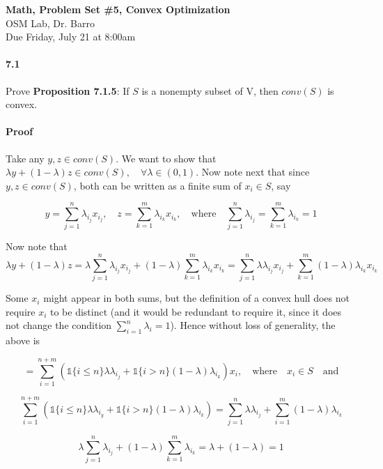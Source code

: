 \documentclass[letterpaper,12pt]{article}
\theoremstyle{definition}
\begin{document}
\begin{flushleft}
   \textbf{\large{Math, Problem Set \#5, Convex Optimization}} \\[5pt]
   OSM Lab, Dr. Barro\\[5pt]
   Due Friday, July 21 at 8:00am
\end{flushleft}

\vspace{5mm}


\paragraph{7.1} Prove \textbf{Proposition 7.1.5}: If $S$ is a nonempty subset of V, then $conv(S)$ is convex.

\paragraph{Proof} Take any $y, z \in conv(S)$. We want to show that $\lambda y + (1 - \lambda) z \in conv(S), \quad \forall \lambda \in (0,1)$. 
Now note next that since $y, z \in conv(S)$, both can be written as a finite sum of $x_i \in S$, say

$$ y = \sum_{j = 1}^n \lambda_{i_j} x_{i_j}, \quad z = \sum_{k = 1}^m \lambda_{i_k} x_{i_k}, \quad \text{where} \quad \sum_{j = 1}^n \lambda_{i_j} = \sum_{k = 1}^m \lambda_{i_k} = 1$$

Now note that 
$$\lambda y + (1 - \lambda) z = \lambda \sum_{j = 1}^n \lambda_{i_j} x_{i_j} + (1 - \lambda) \sum_{k = 1}^m \lambda_{i_k} x_{i_k} 
=  \sum_{j = 1}^n \lambda \lambda_{i_j} x_{i_j} + \sum_{k = 1}^m (1 - \lambda) \lambda_{i_k} x_{i_k}$$

Some $x_i$ might appear in both sums, but the definition of a convex hull does not require $x_i$ to be distinct (and it would be redundant to require it, since it does not change the condition $\sum_{i = 1}^n \lambda_{i} = 1$). Hence without loss of generality, the above is

$$ =  \sum_{i = 1}^{n + m} (\mathds{1}\{i \le n\} \lambda \lambda_{i_j} + \mathds{1}\{i > n\}  (1 - \lambda) \lambda_{i_k}) x_{i}, \quad \text{where} \quad x_{i} \in S \quad \text{and}$$

$$\sum_{i = 1}^{n + m} (\mathds{1}\{i \le n\} \lambda \lambda_{i_y} + \mathds{1}\{i > n\}  (1 - \lambda) \lambda_{i_k}) 
= \sum_{j = 1}^n \lambda \lambda_{i_j}  + \sum_{i = 1}^m (1 - \lambda) \lambda_{i_k}  $$

$$ \lambda \sum_{j = 1}^n \lambda_{i_j} + (1 - \lambda) \sum_{k = 1}^m \lambda_{i_k}
= \lambda + (1 - \lambda) = 1$$
\end{document}
